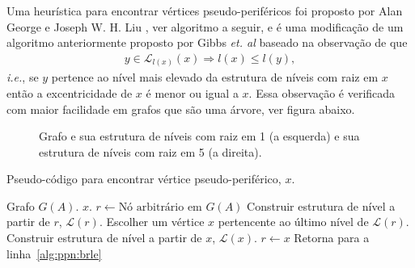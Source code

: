 Uma heurística para encontrar vértices pseudo-periféricos foi proposto por Alan
George e Joseph W. H. Liu \cite{George:1979:NodeFinder}, ver algoritmo a seguir, e
é uma modificação de um algoritmo anteriormente proposto por Gibbs \textit{et.
al} \cite{Gibbs:1976:ReducingBandwidth} baseado na observação de que
\begin{align*}
    y \in \mathcal{L}_{l(x)}(x) \Longrightarrow l(x) \leq l(y),
\end{align*}
\textit{i.e.}, se $y$ pertence ao nível mais elevado da estrutura de níveis com
raiz em $x$ então a excentricidade de $x$ é menor ou igual a $x$. Essa
observação é verificada com maior facilidade em grafos que são uma árvore, ver
figura abaixo.
\begin{figure}[!hbt]
    \centering
    \caption{Grafo e sua estrutura de níveis com raiz em 1 (a esquerda) e sua
    estrutura de níveis com raiz em 5 (a direita).}
    \label{fig:ilus_obser}
\end{figure}
\begin{algorithm}[H]
    \caption{Pseudo-código para encontrar vértice pseudo-periférico, $x$.}
    \label{alg:ppn}
    \begin{algorithmic}[1]
        \REQUIRE Grafo $G(A)$.
        \ENSURE $x$.
        \STATE $r \longleftarrow \text{Nó arbitrário em }G(A)$
        \STATE Construir estrutura de nível a partir de $r$, $\mathcal{L}(r)$.
        \label{alg:ppn:brle}
        \STATE Escolher um vértice $x$ pertencente ao último nível de
        $\mathcal{L}(r)$.
        \STATE Construir estrutura de nível a partir de $x$, $\mathcal{L}(x)$.
            \STATE $r \longleftarrow x$
            \STATE Retorna para a linha~\ref{alg:ppn:brle}
        \ENDIF
    \end{algorithmic}
\end{algorithm}

